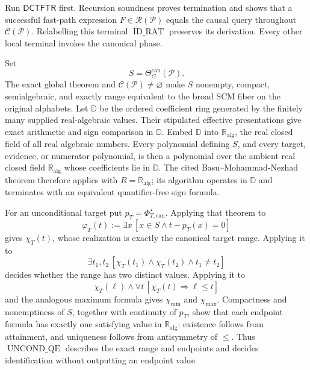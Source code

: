 Run \(\mathsf{DCTFTR}\) first.  Recursion soundness proves termination and shows that a successful fast-path expression \(F\in\mathscr R(\mathcal P)\) equals the causal query throughout \(\mathcal C(\mathcal P)\).  Relabelling this terminal \(\operatorname{ID\_RAT}\) preserves its derivation.  Every other local terminal invokes the canonical phase.

Set
\[
S=\Theta_G^{\mathrm{can}}(\mathcal P).
\]
The exact global theorem and \(\mathcal C(\mathcal P)\ne\varnothing\) make \(S\) nonempty, compact, semialgebraic, and exactly range equivalent to the broad SCM fiber on the original alphabets.  Let \(\mathbb D\) be the ordered coefficient ring generated by the finitely many supplied real-algebraic values.  Their stipulated effective presentations give exact arithmetic and sign comparison in \(\mathbb D\).  Embed \(\mathbb D\) into \(\mathbb R_{\mathrm{alg}}\), the real closed field of all real algebraic numbers.  Every polynomial defining \(S\), and every target, evidence, or numerator polynomial, is then a polynomial over the ambient real closed field \(\mathbb R_{\mathrm{alg}}\) whose coefficients lie in \(\mathbb D\).  The cited Basu--Mohammad-Nezhad theorem therefore applies with \(R=\mathbb R_{\mathrm{alg}}\); its algorithm operates in \(\mathbb D\) and terminates with an equivalent quantifier-free sign formula.

For an unconditional target put \(p_T=\Phi_{T,\mathrm{can}}^\star\).  Applying that theorem to
\[
\varphi_T(t):=\exists x\,[x\in S\wedge t-p_T(x)=0]
\tag{1}
\]
gives \(\chi_T(t)\), whose realization is exactly the canonical target range.  Applying it to
\[
\exists t_1,t_2\,[\chi_T(t_1)\wedge\chi_T(t_2)
\wedge t_1\ne t_2]
\tag{2}
\]
decides whether the range has two distinct values.  Applying it to
\[
\chi_T(\ell)\wedge
\forall t\,[\chi_T(t)\Longrightarrow\ell\leq t]
\tag{3}
\]
and the analogous maximum formula gives \(\chi_{\min}\) and \(\chi_{\max}\).  Compactness and nonemptiness of \(S\), together with continuity of \(p_T\), show that each endpoint formula has exactly one satisfying value in \(\mathbb R_{\mathrm{alg}}\): existence follows from attainment, and uniqueness follows from antisymmetry of \(\leq\).  Thus \(\operatorname{UNCOND\_QE}\) describes the exact range and endpoints and decides identification without outputting an endpoint value.

